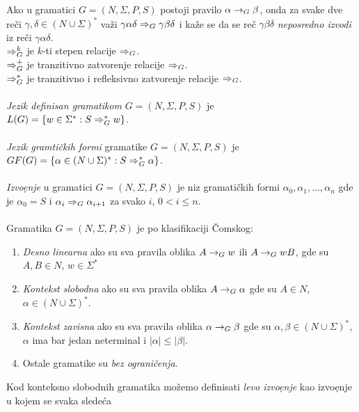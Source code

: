       Ako u gramatici $G=(N,\Sigma,P,S)$ postoji pravilo $\alpha\rightarrow_{G}\beta$,
      onda za svake dve re\v ci $\gamma,\delta\in(N\cup\Sigma)^{*}$ va\v zi
      $\gamma\alpha\delta\Rightarrow_{G}\gamma\beta\delta$ i ka\v ze se da se re\v c
      $\gamma\beta\delta$ {\em neposredno izvodi} iz re\v ci
      $\gamma\alpha\delta$.\\
      $\Rightarrow^{k}_{G}$ je $k$-ti stepen relacije $\Rightarrow_{G}$.\\
      $\Rightarrow^{+}_{G}$ je tranzitivno zatvorenje relacije $\Rightarrow_{G}$.\\
      $\Rightarrow^{*}_{G}$ je tranzitivno i refleksivno zatvorenje relacije $\Rightarrow_{G}$.\\
      \\
      {\em Jezik definisan gramatikom} $G=(N,\Sigma,P,S)$ je\\
      $L(G)=\{w\in\Sigma^{*}:S\Rightarrow^{*}_{G}w\}$.\\
      \\
      {\em Jezik gramti\v ckih formi} gramatike $G=(N,\Sigma,P,S)$ je\\
      $GF(G)=\{\alpha\in(N\cup\Sigma)^{*}:S\Rightarrow^{*}_{G}\alpha\}$.\\
      \\
      {\em Izvo\d enje} u gramatici $G=(N,\Sigma,P,S)$ je niz gramati\v ckih
      formi $\alpha_{0},\alpha_{1},\ldots,\alpha_{n}$ gde je $\alpha_{0}=S$
      i $\alpha_{i}\Rightarrow_{G}\alpha_{i+1}$ za svako $i$, $0<i\leq n$.\\
      \\
      Gramatika $G=(N,\Sigma,P,S)$ je po klasifikaciji \v Comskog:
      \begin{enumerate}
        \item
        {
          {\em Desno linearna} ako su sva pravila oblika $A\rightarrow_{G} w$ ili
          $A\rightarrow_{G} wB$, gde su $A,B\in N$, $w\in \Sigma^{*}$
        }
        \item
        {
          {\em Kontekst slobodna} ako su sva pravila oblika $A\rightarrow_{G}\alpha$
          gde su $A\in N$, $\alpha\in(N\cup\Sigma)^{*}$.
        }
        \item
        {
          {\em Kontekst zavisna} ako su sva pravila oblika $\alpha\rightarrow_{G}\beta$
          gde su $\alpha,\beta\in(N\cup\Sigma)^{*}$, $\alpha$ ima bar jedan
          neterminal i $|\alpha|\leq|\beta|$.
        }
        \item
        {
          Ostale gramatike su {\em bez ograni\v cenja}.
        }
      \end{enumerate}
      Kod konteksno slobodnih gramatika mo\v zemo definisati {\em levo
      izvo\d enje} kao izvo\-\d enje u kojem se svaka slede\'ca

